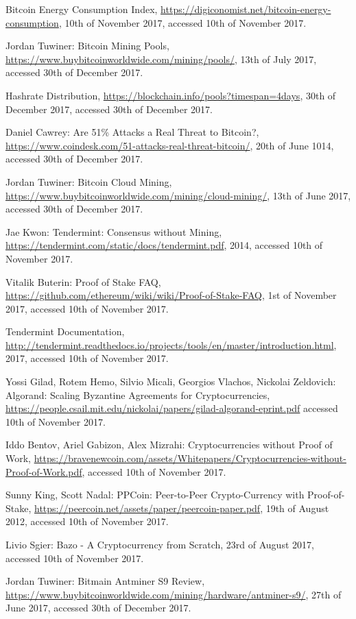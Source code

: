 \begin{thebibliography}{99}
Bitcoin Energy Consumption Index, \url{https://digiconomist.net/bitcoin-energy-consumption}, 10th of November 2017, accessed 10th of November 2017.

 Jordan Tuwiner: Bitcoin Mining Pools, \url{https://www.buybitcoinworldwide.com/mining/pools/}, 13th of July 2017, accessed 30th of December 2017.

 Hashrate Distribution, \url{https://blockchain.info/pools?timespan=4days}, 30th of December 2017, accessed 30th of December 2017.

 Daniel Cawrey: Are 51\% Attacks a Real Threat to Bitcoin?, \url{https://www.coindesk.com/51-attacks-real-threat-bitcoin/}, 20th of June 1014, accessed 30th of December 2017.

 Jordan Tuwiner: Bitcoin Cloud Mining, \url{https://www.buybitcoinworldwide.com/mining/cloud-mining/}, 13th of June 2017, accessed 30th of December 2017.

 Jae Kwon: Tendermint: Consensus without Mining, \url{https://tendermint.com/static/docs/tendermint.pdf}, 2014, accessed 10th of November 2017.

 Vitalik Buterin: Proof of Stake FAQ, \url{https://github.com/ethereum/wiki/wiki/Proof-of-Stake-FAQ},  1st of November 2017, accessed 10th of November 2017.

 Tendermint Documentation, \url{http://tendermint.readthedocs.io/projects/tools/en/master/introduction.html},  2017, accessed 10th of November 2017.

 Yossi Gilad, Rotem Hemo, Silvio Micali, Georgios Vlachos, Nickolai Zeldovich: Algorand: Scaling Byzantine Agreements for Cryptocurrencies, \url{https://people.csail.mit.edu/nickolai/papers/gilad-algorand-eprint.pdf} accessed 10th of November 2017.

 Iddo Bentov, Ariel Gabizon, Alex Mizrahi: Cryptocurrencies without Proof of Work, \url{https://bravenewcoin.com/assets/Whitepapers/Cryptocurrencies-without-Proof-of-Work.pdf}, accessed 10th of November 2017.

 Sunny King, Scott Nadal: PPCoin: Peer-to-Peer Crypto-Currency with Proof-of-Stake, \url{https://peercoin.net/assets/paper/peercoin-paper.pdf}, 19th of August 2012, accessed 10th of November 2017.

 Livio Sgier: Bazo - A Cryptocurrency from Scratch, 23rd of August 2017, accessed 10th of November 2017.

 Jordan Tuwiner: Bitmain Antminer S9 Review, \url{https://www.buybitcoinworldwide.com/mining/hardware/antminer-s9/}, 27th of June 2017, accessed 30th of December 2017.

\end{thebibliography}

